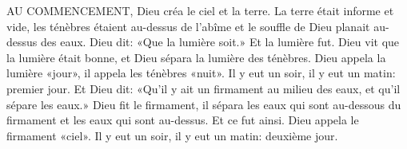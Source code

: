 AU COMMENCEMENT, Dieu créa le ciel et la terre.
La terre était informe et vide,
	les ténèbres étaient au-dessus de l’abîme 
	et le souffle de Dieu planait au-dessus des eaux.
Dieu dit: «Que la lumière soit.» Et la lumière fut.
Dieu vit que la lumière était bonne,
	et Dieu sépara la lumière des ténèbres.
Dieu appela la lumière «jour», il appela les ténèbres «nuit».
Il y eut un soir, il y eut un matin: premier jour.
Et Dieu dit: «Qu’il y ait un firmament au milieu des eaux,
	et qu’il sépare les eaux.»
Dieu fit le firmament, 
	il sépara les eaux qui sont au-dessous du firmament 
	et les eaux qui sont au-dessus. Et ce fut ainsi.
Dieu appela le firmament «ciel». 
Il y eut un soir, il y eut un matin: deuxième jour.
